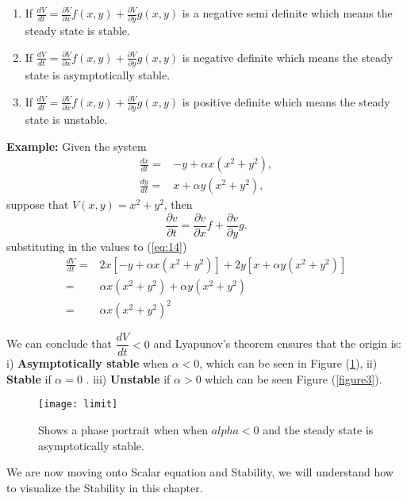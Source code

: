 \documentclass[a4paper]{report}
\theoremstyle{definition}
\begin{document}
\begin{enumerate}
\item If $\frac{dV}{dt}=\frac{\partial V}{\partial x} f(x,y)+ \frac{\partial V}{\partial y} g(x,y)$ is a negative semi definite which means the steady state is stable.
\item  If $\frac{dV}{dt}=\frac{\partial V}{\partial x} f(x,y)+ \frac{\partial V}{\partial y} g(x,y)$ is negative definite which means the steady state is asymptotically stable.
\item  If $\frac{dV}{dt}=\frac{\partial V}{\partial x} f(x,y)+ \frac{\partial V}{\partial y} g(x,y)$ is positive definite which means the steady state is unstable.
\end{enumerate} 
\textbf{Example:} Given the system 
\begin{align}
\frac{dx}{dt}=& -y+\alpha x(x^2+y^2),\label{eq:12}\\
\frac{dy}{dt}=& x+\alpha y(x^2+y^2),\label{eq:13}
\end{align}
suppose that $V(x,y)= x^2+y^2$, then
\begin{equation}
\frac{\partial v}{\partial t}= \frac{\partial v}{\partial x}f + \frac{\partial v}{\partial y}g. \label{eq:14}
\end{equation}
substituting in the values to (\ref{eq:14})\\
\begin{align*}
\frac{dV}{dt}=&2x[-y+\alpha x(x^2+y^2)] + 2y[x +\alpha y(x^2+y^2)]\\
=&\alpha x(x^2+y^2) + \alpha y(x^2+y^2)\\
=&\alpha x(x^2+y^2)^2
\end{align*}

We can conclude that $\dfrac{dV}{dt} <0$ and Lyapunov's theorem ensures that the origin is: i) \textbf{Asymptotically stable} when $\alpha<0$, which can be seen in Figure (\ref{figure2}), ii) \textbf{Stable} if $\alpha = 0$ . iii) \textbf{Unstable} if $\alpha >0$ which can be seen Figure (\ref{figure3}).
\begin{figure}[H]
 \texttt{[image: limit]}
  \caption{Shows a phase portrait when when $alpha<0$ and the steady state is asymptotically stable.}
  \label{figure2}
\end{figure}

We are now moving onto Scalar equation and Stability, we will understand how to visualize the Stability in this chapter.
\end{document}
